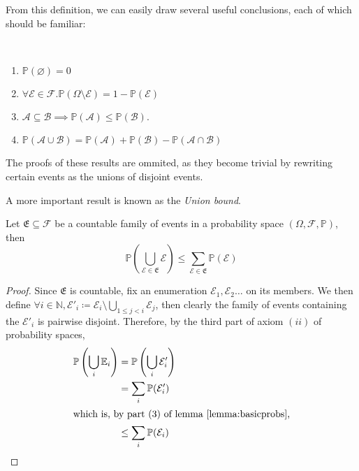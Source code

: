 		From this definition, we can easily draw several useful conclusions, each of which should be familiar:
		\begin{lemma}
			\label{lemma:basicprobs}
			\ \\
			\vspace{-1.5em}
			\begin{enumerate}[(1)]
				\item $\mathbb{P}(\varnothing) = 0$
				\item $\forall \mathcal{E} \in \mathcal{F}. \mathbb{P}(\Omega \setminus \mathcal{E}) = 
				1 - \mathbb{P}(\mathcal{E})$ 
				\item $\mathcal{A} \subseteq \mathcal{B} \implies \mathbb{P}(\mathcal{A}) \leq \mathbb{P}(\mathcal{B})$.
				\item $\mathbb{P}(\mathcal{A} \cup \mathcal{B}) = \mathbb{P}(\mathcal{A}) + \mathbb{P}(\mathcal{B}) - 
				\mathbb{P}(\mathcal{A} \cap \mathcal{B})$
			\end{enumerate}
		\end{lemma}
		The proofs of these results are ommited, as they become trivial by rewriting certain events as the unions of disjoint events.

		A more important result is known as the \emph{Union bound}.
		\begin{theorem}
			Let $\mathfrak{E} \subseteq \mathcal{F}$ be a countable family of events in a probability space $(\Omega, \mathcal{F}, 
			\mathbb{P})$, then 
			$$
				\mathbb{P}\left(\bigcup_{\mathcal{E} \in \mathfrak{E}} \mathcal{E}\right) \leq \sum_{\mathcal{E} \in 
				\mathfrak{E}}\mathbb{P}(\mathcal{E})
			$$
		\end{theorem}
		\begin{proof}
			Since $\mathfrak{E}$ is countable, fix an enumeration $\mathcal{E}_1, \mathcal{E}_2 \hdots$ on its members. 
			We then define $\forall i \in \mathbb{N}, \mathcal{E}'_i \coloneqq \mathcal{E}_i \setminus \bigcup_{1\leq j
			< i} \mathcal{E}_j$, then clearly the family of events containing the $\mathcal{E}'_i$ is pairwise disjoint.
			Therefore, by the third part of axiom $(ii)$ of probability spaces, 
			\begin{align*}
				\mathbb{P}\left(\bigcup_i \mathbb{E}_i\right)&= \mathbb{P}\left(\bigcup_i \mathcal{E}'_i\right) \\
				                                  &= \sum_i \mathbb{P}(\mathcal{E}'_i) \\
					\intertext{which is, by part $(3)$ of lemma \ref{lemma:basicprobs},}
								  &\leq \sum_i \mathbb{P}(\mathcal{E}_i)
			\end{align*}
		\end{proof}

